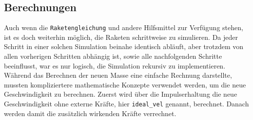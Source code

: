 \documentclass[11pt]{article}
\begin{document}
\subsection{Berechnungen}
\label{sec:orgfcd4372}
Auch wenn die \texttt{Raketengleichung} und andere Hilfsmittel zur Verfügung stehen, ist
es doch weiterhin möglich, die Raketen schrittweise zu simulieren. Da jeder
Schritt in einer solchen Simulation beinahe identisch abläuft, aber trotzdem von
allen vorherigen Schritten abhängig ist, sowie alle nachfolgenden Schritte
beeinflusst, war es nur logisch, die Simulation rekursiv zu implementieren. \\

Während das Berechnen der neuen Masse eine einfache Rechnung darstellte, mussten
kompliziertere mathematische Konzepte verwendet werden, um die neue
Geschwindigkeit zu berechnen. Zuerst wird über die Impulserhaltung die neue
Geschwindigkeit ohne externe Kräfte, hier \texttt{ideal\_vel} genannt, berechnet. Danach
werden damit die zusätzlich wirkenden Kräfte verrechnet.
\end{document}
